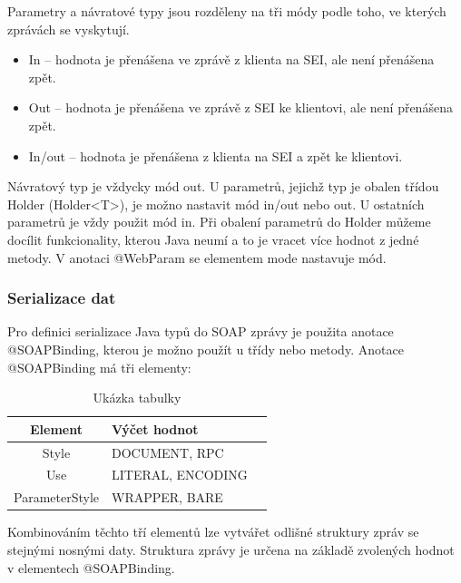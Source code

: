 \documentclass[11pt,twoside,a4paper]{book}
\begin{document}
Parametry a návratové typy jsou rozděleny na tři módy podle toho, ve kterých zprávách se
vyskytují.

\begin{itemize}
  \item In – hodnota je přenášena ve zprávě z klienta na SEI, ale není přenášena zpět.
  \item Out – hodnota je přenášena ve zprávě z SEI ke klientovi, ale není přenášena zpět.
  \item In/out – hodnota je přenášena z klienta na SEI a zpět ke klientovi.
\end{itemize}

Návratový typ je vždycky mód out. U parametrů, jejichž typ je obalen třídou Holder
(Holder<T>), je možno nastavit mód in/out nebo out. U ostatních parametrů je vždy použit
mód in. Při obalení parametrů do Holder můžeme docílit funkcionality, kterou Java neumí a to
je vracet více hodnot z jedné metody. V anotaci @WebParam se elementem mode nastavuje
mód.

\subsubsection{Serializace dat}

Pro definici serializace Java typů do SOAP zprávy je použita anotace @SOAPBinding, kterou
je možno použít u třídy nebo metody. Anotace @SOAPBinding má tři elementy:

\begin{table}[h]
\begin{center}
\begin{tabular}{|c|l|l|}
\hline
\textbf{Element} & \textbf{Výčet hodnot} \\
\hline
Style & DOCUMENT, RPC \\
\hline
Use & LITERAL, ENCODING \\
\hline
ParameterStyle & WRAPPER, BARE \\
\hline
\end{tabular}
\end{center}
\caption{Ukázka tabulky}
\label{tab:tab1}
\end{table}

Kombinováním těchto tří elementů lze vytvářet odlišné struktury zpráv se stejnými nosnými
daty. Struktura zprávy je určena na základě zvolených hodnot v elementech @SOAPBinding.
\end{document}
